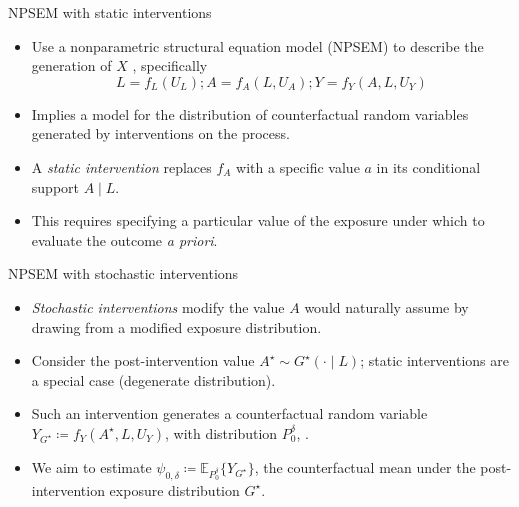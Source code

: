 \documentclass{beamer}
\newcommand{\E}{\mathbb{E}}
\begin{document}
\begin{frame}[c]{NPSEM with static interventions}

\begin{center}
\begin{itemize}
  \itemsep10pt
  \item Use a nonparametric structural equation model (NPSEM) to describe the
    generation of $X$ \citep{pearl2009causality}, specifically
    \begin{equation*}
      L = f_L(U_L); A = f_A(L, U_A); Y = f_Y(A, L, U_Y)
    \end{equation*}
  \item Implies a model for the distribution of counterfactual random variables
    generated by interventions on the process.
  \item A \textit{static intervention} replaces $f_A$ with a specific value $a$
    in its conditional support $A \mid L$.
  \item This requires specifying a particular value of the exposure under which
    to evaluate the outcome \textit{a priori}.
\end{itemize}
\end{center}

\note{
}

\end{frame}


\begin{frame}[c]{NPSEM with stochastic interventions}

\begin{center}
\begin{itemize}
  \itemsep10pt
  \item \textit{Stochastic interventions} modify the value $A$ would naturally
    assume by drawing from a modified exposure distribution.
  \item Consider the post-intervention value $A^{\star} \sim G^{\star}(\cdot
    \mid L)$; static interventions are a special case (degenerate distribution).
  \item Such an intervention generates a counterfactual random variable
    $Y_{G^{\star}} \coloneqq f_Y(A^{\star}, L, U_Y)$, with distribution
    $P_0^{\delta}$, .
  \item We aim to estimate $\psi_{0,\delta} \coloneqq \E_{P_0^{\delta}}
    \{Y_{G^{\star}}\}$, the counterfactual mean under the post-intervention
    exposure distribution $G^{\star}$.
\end{itemize}
\end{center}

\note{
}

\end{frame}
\end{document}
